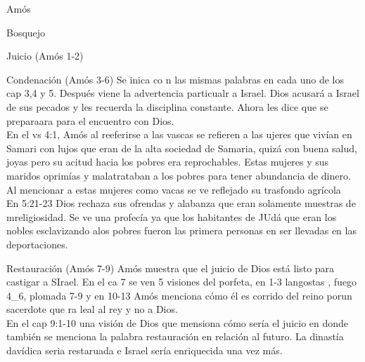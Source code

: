 \documentclass[12pt]{article}
\begin{document}
\begin{section}{Amós}
\begin{subsection}{Bosquejo}
\begin{subsubsection}{Juicio (Amós 1-2)}
		\end{subsubsection}
		\begin{subsubsection}{Condenación (Amós 3-6)}
			Se inica co n las mismas palabras en cada uno de los cap 3,4 y 5. Después viene la advertencia particualr a Israel. Dios acusará a Israel de sus pecados y les recuerda la disciplina constante. Ahora les dice que se preparaara para el encuentro con Dios.\\
			En el vs 4:1, Amós al reeferirse a las vascas se refieren a las ujeres que vivían en Samari con lujos que eran de la alta sociedad de Samaria, quizá con buena salud, joyas pero su acitud hacia los pobres era reprochables. Estas mujeres y sus maridos oprimías y malatrataban a los pobres para tener abundancia de dinero. Al mencionar a estas mujeres como vacas se ve reflejado su trasfondo agrícola\\
			En 5:21-23 Dios rechaza sus ofrendas y alabanza que eran solamente muestras de mreligiosidad. Se ve una profecía ya que los habitantes de JUdá que eran los nobles esclavizando alos pobres fueron las primera personas en ser llevadas en las deportaciones.
		\end{subsubsection}
		\begin{subsubsection}{Restauración (Amós 7-9)}
			Amós muestra que el juicio de Dios está listo para castigar a SIrael. En el ca 7 se ven 5 visiones del porfeta, en 1-3 langostas , fuego 4_6, plomada 7-9 y en 10-13 Amós menciona cómo él es corrido del reino porun sacerdote que ra leal al rey y no a Dios.\\
			En el cap 9:1-10 una visión de Dios que mensiona cómo sería el juicio en donde también se menciona la palabra restauración en relación al futuro. La dinastía davídica seria restaruada e Israel sería enriquecida una vez más.\\
		\end{subsubsection}
	\end{subsection}
\end{section}
\end{document}
